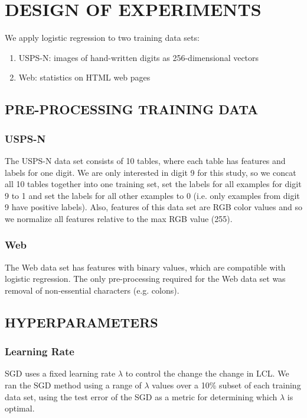 \section{DESIGN OF EXPERIMENTS}
\label{sec:experiments}

We apply logistic regression to two training data sets:
\begin{enumerate}
    \item USPS-N: images of hand-written digits as 256-dimensional vectors \cite{USPS}
    \item Web: statistics on HTML web pages \cite{Web}
\end{enumerate}


\subsection{PRE-PROCESSING TRAINING DATA}

\subsubsection{USPS-N}
The USPS-N data set consists of 10 tables, where each table has features and labels for one digit. We are only interested in digit 9 for this study, so we concat all 10 tables together into one training set, set the labels for all examples for digit 9 to 1 and set the labels for all other examples to 0 (i.e. only examples from digit 9 have positive labels). Also, features of this data set are RGB color values and so we normalize all features relative to the max RGB value (255).

\subsubsection{Web}
The Web data set has features with binary values, which are compatible with logistic regression. The only pre-processing required for the Web data set was removal of non-essential characters (e.g. colons).


\subsection{HYPERPARAMETERS}

\subsubsection{Learning Rate}
SGD uses a fixed learning rate $\lambda$ to control the change the change in LCL. We ran the SGD method using a range of $\lambda$ values over a 10\% subset of each training data set, using the test error of the SGD as a metric for determining which $\lambda$ is optimal.

